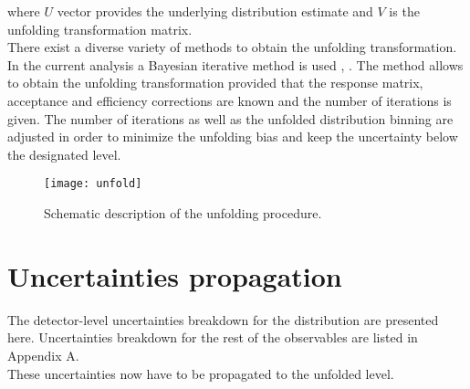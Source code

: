  where $U$ vector provides the underlying distribution estimate and $V$ is the unfolding transformation matrix.\\
 There exist a diverse variety of methods to obtain the unfolding transformation. In the current analysis a Bayesian iterative method is used \cite{unfolding1}, \cite{unfolding2}. The method allows to obtain the unfolding transformation provided that the response matrix, acceptance and efficiency corrections are known and the number of iterations is given. The number of iterations as well as the unfolded distribution binning are adjusted in order to minimize the unfolding bias and keep the uncertainty below the designated level.

\begin{figure}[htpb]
	\centering
	\texttt{[image: unfold]}
	\caption[Unfolding]{Schematic description of the unfolding procedure.}
	\label{fig::unfolding}
\end{figure}

\section{Uncertainties propagation}
The detector-level uncertainties breakdown for the \pt distribution are presented here. Uncertainties breakdown for the rest of the observables are listed in Appendix A. \\
These uncertainties now have to be propagated to the unfolded level. 
